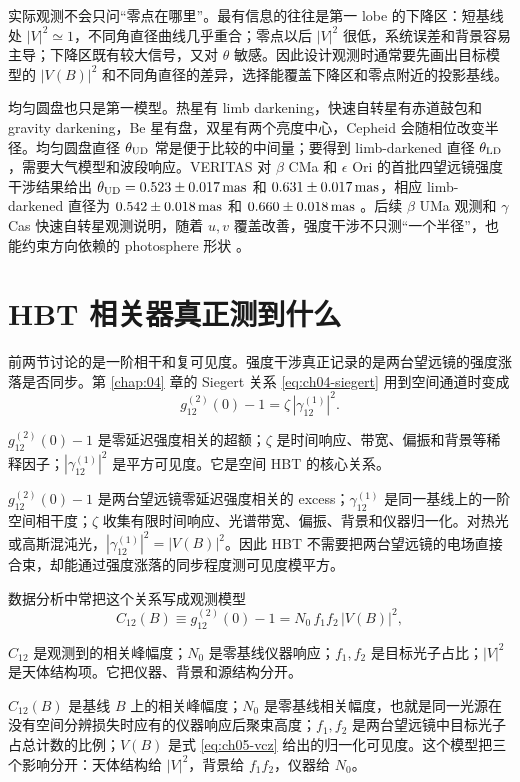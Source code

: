 实际观测不会只问“零点在哪里”。最有信息的往往是第一 lobe 的下降区：短基线处 \(|V|^2\simeq1\)，不同角直径曲线几乎重合；零点以后 \(|V|^2\) 很低，系统误差和背景容易主导；下降区既有较大信号，又对 \(\theta\) 敏感。因此设计观测时通常要先画出目标模型的 \(|V(B)|^2\) 和不同角直径的差异，选择能覆盖下降区和零点附近的投影基线。

均匀圆盘也只是第一模型。热星有 limb darkening，快速自转星有赤道鼓包和 gravity darkening，Be 星有盘，双星有两个亮度中心，Cepheid 会随相位改变半径。均匀圆盘直径 \(\theta_{\rm UD}\) 常是便于比较的中间量；要得到 limb-darkened 直径 \(\theta_{\rm LD}\)，需要大气模型和波段响应。VERITAS 对 \(\beta\) CMa 和 \(\epsilon\) Ori 的首批四望远镜强度干涉结果给出 \(\theta_{\rm UD}=0.523\pm0.017\,{\rm mas}\) 和 \(0.631\pm0.017\,{\rm mas}\)，相应 limb-darkened 直径为 \(0.542\pm0.018\,{\rm mas}\) 和 \(0.660\pm0.018\,{\rm mas}\) \citep{2020NatAs...4.1164A}。后续 \(\beta\) UMa 观测和 \(\gamma\) Cas 快速自转星观测说明，随着 \(u,v\) 覆盖改善，强度干涉不只测“一个半径”，也能约束方向依赖的 photosphere 形状 \citep{2024ApJ...966...28A,2025ApJ...995..191A}。

\section{HBT 相关器真正测到什么}

前两节讨论的是一阶相干和复可见度。强度干涉真正记录的是两台望远镜的强度涨落是否同步。第 \ref{chap:04} 章的 Siegert 关系 \eqref{eq:ch04-siegert} 用到空间通道时变成
\begin{equation}
  g_{12}^{(2)}(0)-1
  =
  \zeta\,\left|\gamma_{12}^{(1)}\right|^2 .
  \label{eq:ch05-hbt-spatial}
\end{equation}
\begin{formulaexplain}
\(g_{12}^{(2)}(0)-1\) 是零延迟强度相关的超额；\(\zeta\) 是时间响应、带宽、偏振和背景等稀释因子；\(|\gamma_{12}^{(1)}|^2\) 是平方可见度。它是空间 HBT 的核心关系。
\end{formulaexplain}
\(g_{12}^{(2)}(0)-1\) 是两台望远镜零延迟强度相关的 excess；\(\gamma_{12}^{(1)}\) 是同一基线上的一阶空间相干度；\(\zeta\) 收集有限时间响应、光谱带宽、偏振、背景和仪器归一化。对热光或高斯混沌光，\(|\gamma_{12}^{(1)}|^2=|V(B)|^2\)。因此 HBT 不需要把两台望远镜的电场直接合束，却能通过强度涨落的同步程度测可见度模平方。

数据分析中常把这个关系写成观测模型
\begin{equation}
  C_{12}(B)
  \equiv g_{12}^{(2)}(0)-1
  =
  N_0\,f_1 f_2\,|V(B)|^2 ,
  \label{eq:ch05-correlation-model}
\end{equation}
\begin{formulaexplain}
\(C_{12}\) 是观测到的相关峰幅度；\(N_0\) 是零基线仪器响应；\(f_1,f_2\) 是目标光子占比；\(|V|^2\) 是天体结构项。它把仪器、背景和源结构分开。
\end{formulaexplain}
\(C_{12}(B)\) 是基线 \(B\) 上的相关峰幅度；\(N_0\) 是零基线相关幅度，也就是同一光源在没有空间分辨损失时应有的仪器响应后聚束高度；\(f_1,f_2\) 是两台望远镜中目标光子占总计数的比例；\(V(B)\) 是式 \eqref{eq:ch05-vcz} 给出的归一化可见度。这个模型把三个影响分开：天体结构给 \(|V|^2\)，背景给 \(f_1f_2\)，仪器给 \(N_0\)。

